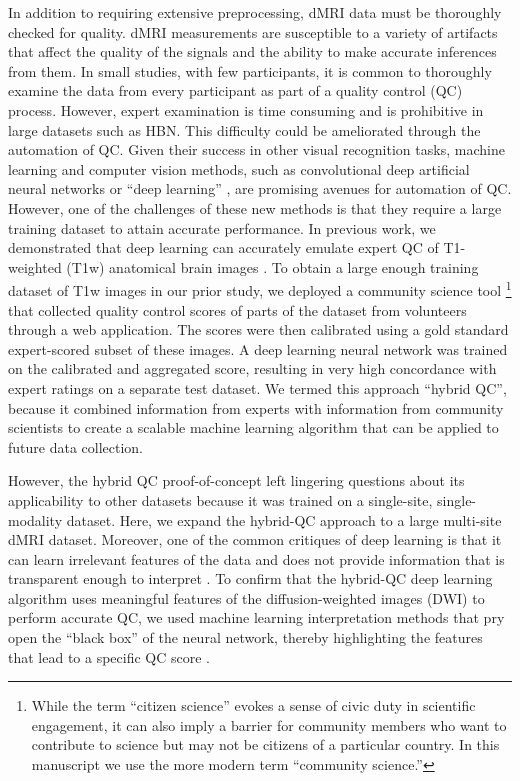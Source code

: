 \documentclass[fleqn,10pt,inline]{wlscirep}
\begin{document}
In addition to requiring extensive preprocessing, dMRI data must be thoroughly checked for quality. dMRI measurements are susceptible to a variety of artifacts that affect
the quality of the signals and the ability to make accurate inferences from
them. In small studies, with few participants, it is common to thoroughly
examine the data from every participant as part of a quality control (QC)
process. However, expert examination is time consuming and is prohibitive in large
datasets such as HBN. This difficulty could be ameliorated through the
automation of QC. Given their success in other visual recognition tasks, machine learning and computer vision methods, such as convolutional deep
artificial neural networks or ``deep learning'' \cite{lecun2015deep}, are
promising avenues for automation of QC. However, one of the challenges of these new
methods is that they require a large training dataset to attain accurate
performance. In previous work, we demonstrated that deep learning can accurately
emulate expert QC of T1-weighted (T1w) anatomical brain images
\cite{keshavan2019-er}. To obtain a large enough training dataset of T1w images
in our prior study, we deployed a community science tool
\footnote{%
    While the term ``citizen science'' evokes a sense of civic duty in
    scientific engagement, it can also imply a barrier for community members who
    want to contribute to science but may not be citizens of a particular
    country. In this manuscript we use the more modern term ``community
    science.''
}
that collected quality
control scores of parts of the dataset from volunteers through a web application.
The scores were then calibrated using a gold standard expert-scored subset of
these images. A deep learning neural network was trained on the calibrated and
aggregated score, resulting in very high concordance with expert ratings on a
separate test dataset. We termed this approach ``hybrid QC'', because it combined
information from experts with information from community scientists to create a
scalable machine learning algorithm that can be applied to future data
collection.

However, the hybrid QC proof-of-concept left lingering questions about its
applicability to other datasets because it was trained on a single-site,
single-modality dataset. Here, we expand the hybrid-QC approach to a large
multi-site dMRI dataset. Moreover, one of the common critiques of deep
learning is that it can learn irrelevant features of the data and does not
provide information that is transparent enough to interpret
\cite{lipton2017doctor, salahuddin2022transparency, Zech2018-ki}. To confirm
that the hybrid-QC deep learning algorithm uses meaningful features of the
diffusion-weighted images (DWI) to perform accurate QC, we used machine learning
interpretation methods that pry open the ``black box'' of the neural network, thereby
highlighting the features that lead to a specific QC score
\cite{sundararajan2017axiomatic, murdoch2019definitions}.
\end{document}
